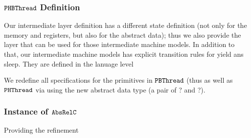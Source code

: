 


\subsubsection{${\mathrm{\texttt{PHBThread}}}$ Definition}

Our intermediate layer definition has a different state definition (not only for the memory and registers, but also for the abstract data); thus we also provide the 
layer that can be used for those intermediate machine models. 
In addition to that, our intermediate machine models has explicit 
transition rules for yield ans sleep. 
They are defined in the lanuage level 


We redefine all specifications for the primitives in ${\mathrm{\texttt{PBThread}}}$ (thus as well as ${\mathrm{\texttt{PHThread}}}$ 
via using the new abstract data type (a pair of ? and ?).



\subsubsection{Instance of ${\mathrm{\texttt{AbsRelC}}}$}

Providing the refinement 

